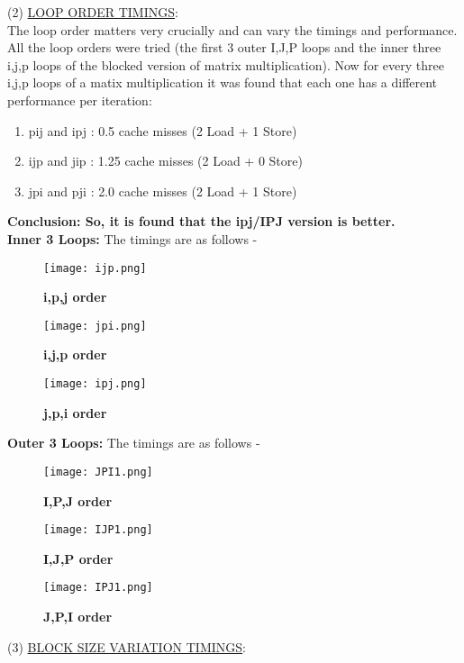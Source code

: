 \documentclass{article}
\begin{document}
\noindent (2) \underline{LOOP ORDER TIMINGS}: \\

\noindent The loop order matters very crucially and can vary the timings and performance. All the loop orders were tried (the first 3 outer I,J,P loops and the inner three i,j,p loops of the blocked version of matrix multiplication). Now for every three i,j,p loops of a matix multiplication it was found that each one has a different performance per iteration:
\begin{enumerate}
    \item pij and ipj : 0.5 cache misses (2 Load + 1 Store)
    \item ijp and jip : 1.25 cache misses (2 Load + 0 Store) 
    \item jpi and pji : 2.0 cache misses (2 Load + 1 Store)
\end{enumerate}
\textbf{ Conclusion: So, it is found that the ipj/IPJ version is better.}
\\\newpage \noindent \textbf{Inner 3 Loops:} The timings are as follows -
 \begin{figure}[htpb!]
     \centering

    \texttt{[image: ijp.png]}
    \caption{ \textbf{i,p,j order}}
    
    \texttt{[image: jpi.png]}
    \caption{ \textbf{i,j,p order}}

    \texttt{[image: ipj.png]}
    \caption{ \textbf{j,p,i order}}
    
  \end{figure} 
  
\newpage

\noindent \textbf{Outer 3 Loops:} The timings are as follows -
 \begin{figure}[htpb!]
     \centering

    \texttt{[image: JPI1.png]}
    \caption{ \textbf{I,P,J order}}

    \texttt{[image: IJP1.png]}
    \caption{ \textbf{I,J,P order}}
    

    \texttt{[image: IPJ1.png]}
    \caption{ \textbf{J,P,I order}}
  \end{figure} 

\newpage

\noindent (3) \underline{BLOCK SIZE VARIATION TIMINGS}:\\
\end{document}
